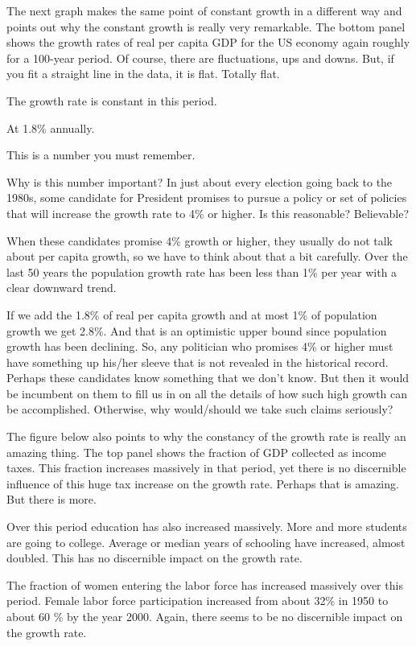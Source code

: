 \documentclass[
]{book}
\begin{document}
The next graph makes the same point of constant growth in a different way and points out why the constant growth is really very remarkable.
The bottom panel shows the growth rates of real per capita GDP for the US economy again roughly for a 100-year period. Of course, there are fluctuations, ups and downs. But, if you fit a straight line in the data, it is flat. Totally flat.

The growth rate is constant in this period.

At 1.8\% annually.

This is a number you must remember.

Why is this number important? In just about every election going back to the 1980s, some candidate for President promises to pursue a policy or set of policies that will increase the growth rate to 4\% or higher.
Is this reasonable? Believable?

When these candidates promise 4\% growth or higher, they usually do not talk about per capita growth, so we have to think about that a bit carefully. Over the last 50 years the population growth rate has been less than 1\% per year with a clear downward trend.

If we add the 1.8\% of real per capita growth and at most 1\% of population growth we get 2.8\%. And that is an optimistic upper bound since population growth has been declining. So, any politician who promises 4\% or higher must have something up his/her sleeve that is not revealed in the historical record. Perhaps these candidates know something that we don't know. But then it would be incumbent on them to fill us in on all the details of how such high growth can be accomplished. Otherwise, why would/should we take such claims seriously?

The figure below also points to why the constancy of the growth rate is really an amazing thing. The top panel shows the fraction of GDP collected as income taxes. This fraction increases massively in that period, yet there is no discernible influence of this huge tax increase on the growth rate. Perhaps that is amazing. But there is more.

Over this period education has also increased massively. More and more students are going to college. Average or median years of schooling have increased, almost doubled. This has no discernible impact on the growth rate.

The fraction of women entering the labor force has increased massively over this period. Female labor force participation increased from about 32\% in 1950 to about 60 \% by the year 2000. Again, there seems to be no discernible impact on the growth rate.
\end{document}
